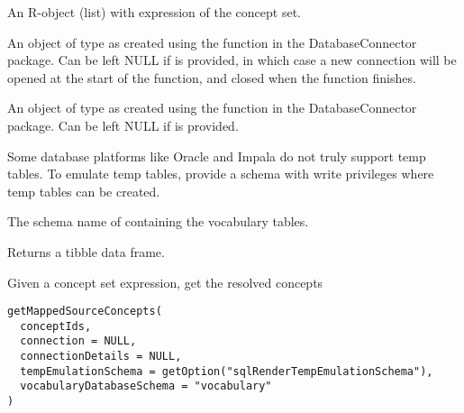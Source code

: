 \documentclass[a4paper]{book}
\begin{document}
\begin{Arguments}
\begin{ldescription}
\item[\code{conceptSetExpression}] An R-object (list) with expression of the concept set.

\item[\code{connection}] An object of type  as created using the
 function in the
DatabaseConnector package. Can be left NULL if 
is provided, in which case a new connection will be opened at the start
of the function, and closed when the function finishes.

\item[\code{connectionDetails}] An object of type  as created using the
 function in the
DatabaseConnector package. Can be left NULL if  is
provided.

\item[\code{tempEmulationSchema}] Some database platforms like Oracle and Impala do not truly support temp tables. To emulate temp 
tables, provide a schema with write privileges where temp tables can be created.

\item[\code{vocabularyDatabaseSchema}] The schema name of containing the vocabulary tables.
\end{ldescription}
\end{Arguments}
%
\begin{Value}
Returns a tibble data frame.
\end{Value}
%
\begin{Description}\relax
Given a concept set expression, get the resolved concepts
\end{Description}
%
\begin{Usage}
\begin{verbatim}
getMappedSourceConcepts(
  conceptIds,
  connection = NULL,
  connectionDetails = NULL,
  tempEmulationSchema = getOption("sqlRenderTempEmulationSchema"),
  vocabularyDatabaseSchema = "vocabulary"
)
\end{verbatim}
\end{Usage}
%
\end{document}
